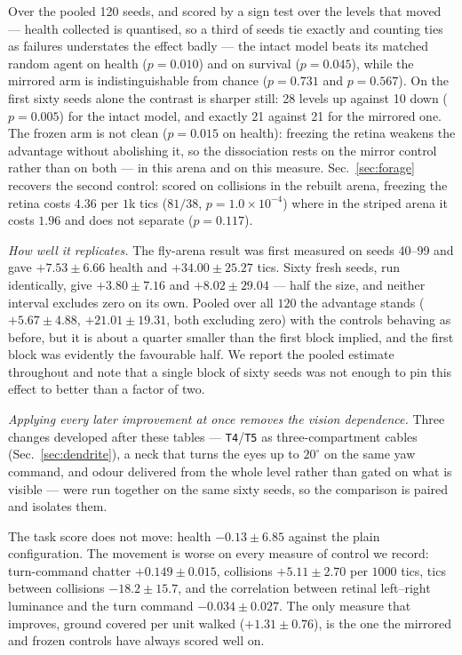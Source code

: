 \documentclass[10pt,twoside]{article}
\newcommand{\cell}[1]{\texttt{#1}}
\begin{document}
Over the pooled 120 seeds, and scored by a sign test over the levels that moved
--- health collected is quantised, so a third of seeds tie exactly and counting
ties as failures understates the effect badly --- the intact model beats its
matched random agent on health ($p=0.010$) and on survival ($p=0.045$), while
the mirrored arm is indistinguishable from chance ($p=0.731$ and $p=0.567$).
On the first sixty seeds alone the contrast is sharper still: 28 levels up
against 10 down ($p=0.005$) for the intact model, and exactly 21 against 21 for
the mirrored one. The frozen arm is not clean ($p=0.015$ on health): freezing
the retina weakens the advantage without abolishing it, so the dissociation
rests on the mirror control rather than on both --- in this arena and on this
measure. Sec.~\ref{sec:forage} recovers the second control: scored on collisions
in the rebuilt arena, freezing the retina costs $4.36$ per $1$k tics
($81/38$, $p=1.0\times10^{-4}$) where in the striped arena it costs $1.96$ and
does not separate ($p=0.117$).

\emph{How well it replicates.} The fly-arena result was first measured on seeds
40--99 and gave $+7.53\pm6.66$ health and $+34.00\pm25.27$ tics. Sixty fresh
seeds, run identically, give $+3.80\pm7.16$ and $+8.02\pm29.04$ --- half the
size, and neither interval excludes zero on its own. Pooled over all $120$ the
advantage stands ($+5.67\pm4.88$, $+21.01\pm19.31$, both excluding zero) with
the controls behaving as before, but it is about a quarter smaller than the
first block implied, and the first block was evidently the favourable half.
We report the pooled estimate throughout and note that a single block of sixty
seeds was not enough to pin this effect to better than a factor of two.

\emph{Applying every later improvement at once removes the vision dependence.}
Three changes developed after these tables --- \cell{T4}/\cell{T5} as
three-compartment cables (Sec.~\ref{sec:dendrite}), a neck that turns the eyes
up to $20^\circ$ on the same yaw command, and odour delivered from the whole
level rather than gated on what is visible --- were run together on the same
sixty seeds, so the comparison is paired and isolates them.

The task score does not move: health $-0.13\pm6.85$ against the plain
configuration. The movement is worse on every measure of control we record:
turn-command chatter $+0.149\pm0.015$, collisions $+5.11\pm2.70$ per
$1000$ tics, tics between collisions $-18.2\pm15.7$, and the correlation
between retinal left--right luminance and the turn command $-0.034\pm0.027$.
The only measure that improves, ground covered per unit walked
($+1.31\pm0.76$), is the one the mirrored and frozen controls have always
scored well on.
\end{document}
